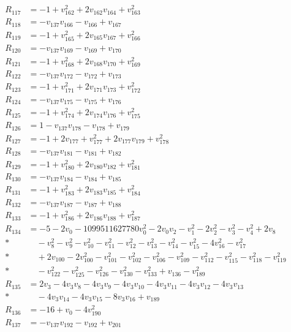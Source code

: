 \begin{align*}
R_{117}&=-1+v_{162}^{2}+2v_{162}v_{164}+v_{163}^{2}\\[2pt]
R_{118}&=-v_{137}v_{166}-v_{166}+v_{167}\\[2pt]
R_{119}&=-1+v_{165}^{2}+2v_{165}v_{167}+v_{166}^{2}\\[2pt]
R_{120}&=-v_{137}v_{169}-v_{169}+v_{170}\\[2pt]
R_{121}&=-1+v_{168}^{2}+2v_{168}v_{170}+v_{169}^{2}\\[2pt]
R_{122}&=-v_{137}v_{172}-v_{172}+v_{173}\\[2pt]
R_{123}&=-1+v_{171}^{2}+2v_{171}v_{173}+v_{172}^{2}\\[2pt]
R_{124}&=-v_{137}v_{175}-v_{175}+v_{176}\\[2pt]
R_{125}&=-1+v_{174}^{2}+2v_{174}v_{176}+v_{175}^{2}\\[2pt]
R_{126}&=1-v_{137}v_{178}-v_{178}+v_{179}\\[2pt]
R_{127}&=-1+2v_{177}+v_{177}^{2}+2v_{177}v_{179}+v_{178}^{2}\\[2pt]
R_{128}&=-v_{137}v_{181}-v_{181}+v_{182}\\[2pt]
R_{129}&=-1+v_{180}^{2}+2v_{180}v_{182}+v_{181}^{2}\\[2pt]
R_{130}&=-v_{137}v_{184}-v_{184}+v_{185}\\[2pt]
R_{131}&=-1+v_{183}^{2}+2v_{183}v_{185}+v_{184}^{2}\\[2pt]
R_{132}&=-v_{137}v_{187}-v_{187}+v_{188}\\[2pt]
R_{133}&=-1+v_{186}^{2}+2v_{186}v_{188}+v_{187}^{2}\\[2pt]
R_{134}&=-5-2v_{0}-1099511627780v_{0}^{2}-2v_{0}v_{2}-v_{1}^{2}-2v_{2}^{2}-v_{3}^{2}-v_{4}^{2}+2v_{8}\\*
&\quad-v_{8}^{2}-v_{9}^{2}-v_{10}^{2}-v_{11}^{2}-v_{12}^{2}-v_{13}^{2}-v_{14}^{2}-v_{15}^{2}-4v_{16}^{2}-v_{17}^{2}\\*
&\quad+2v_{100}-2v_{100}^{2}-v_{101}^{2}-v_{102}^{2}-v_{106}^{2}-v_{109}^{2}-v_{112}^{2}-v_{115}^{2}-v_{118}^{2}-v_{119}^{2}\\*
&\quad-v_{122}^{2}-v_{125}^{2}-v_{126}^{2}-v_{130}^{2}-v_{133}^{2}+v_{136}-v_{189}^{2}\\[2pt]
R_{135}&=2v_{3}-4v_{3}v_{8}-4v_{3}v_{9}-4v_{3}v_{10}-4v_{3}v_{11}-4v_{3}v_{12}-4v_{3}v_{13}\\*
&\quad-4v_{3}v_{14}-4v_{3}v_{15}-8v_{3}v_{16}+v_{189}\\[2pt]
R_{136}&=-16+v_{0}-4v_{190}^{2}\\[2pt]
R_{137}&=-v_{137}v_{192}-v_{192}+v_{201}\\[2pt]

\end{align*}
